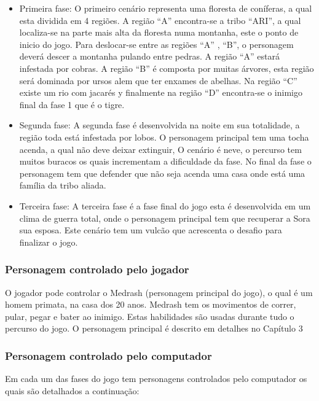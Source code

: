 \begin{itemize}
\item Primeira fase: 
O primeiro cenário representa uma floresta de coníferas, a qual esta dividida em 
4 regiões. A região ``A'' encontra-se a tribo ``ARI'', a qual localiza-se na parte mais alta
 da floresta numa montanha, este o ponto de inicio do jogo. Para deslocar-se entre
 as regiões ``A'' , ``B'', o personagem deverá descer a montanha pulando entre pedras.
 A região ``A'' estará infestada por cobras. A região ``B'' é composta por muitas árvores,
 esta região será dominada por ursos alem que ter enxames de abelhas. Na região ``C'' 
existe um rio com jacarés y finalmente na região ``D'' encontra-se o inimigo final da fase 1 
que é o tigre.

\item Segunda fase: 
A segunda fase é desenvolvida na noite em sua totalidade, a região toda está infestada 
por lobos. O personagem principal tem uma tocha acenda, a qual não deve deixar
 extinguir, O cenário é neve, o percurso tem muitos buracos os quais incrementam 
a dificuldade da fase. No final da fase o personagem tem que defender que não seja
 acenda uma casa onde está uma família da tribo aliada.

\item Terceira fase: 
A terceira fase é a fase final do jogo esta é desenvolvida em um clima de guerra total,
 onde o personagem principal tem que recuperar a Sora sua esposa. Este cenário tem 
um vulcão que acrescenta o desafio para finalizar o jogo. 
\end{itemize}


\subsubsection{Personagem controlado pelo jogador}
O jogador pode controlar o Medrash (personagem principal do jogo), o qual é um 
homem primata, na casa dos 20 anos. Medrash tem os movimentos de correr, pular, 
pegar e bater ao inimigo. Estas habilidades são usadas durante tudo o percurso do jogo. 
O personagem principal é descrito em detalhes no Capítulo 3

\subsubsection{Personagem controlado pelo computador}
Em cada um das fases do jogo tem personagens controlados pelo computador os quais 
são detalhados a continuação:


